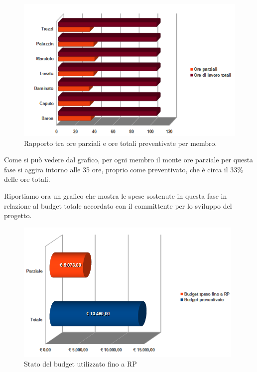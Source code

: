 \vspace{0cm}
\begin{figure}[htbp!]
  \centering
  \includegraphics[width=17.2cm, angle=0]{img/PP/ORE-RP.png}
\caption{Rapporto tra ore parziali e ore totali preventivate per membro.}
\end{figure}
\vspace{0.5cm}

Come si pu\`o vedere dal grafico, per ogni membro il monte ore parziale per
questa fase si aggira intorno alle 35 ore, proprio come preventivato, che \`e
circa il 33\% delle ore totali.

\newpage
Riportiamo ora un grafico che mostra le spese sostenute in questa
fase in relazione al budget totale accordato con il committente per lo sviluppo del progetto.

\vspace{0cm}
\begin{figure}[htbp!]
  \centering
  \includegraphics[width=11cm, angle=0]{img/PP/BUDGET-RP.png}
\caption{Stato del budget utilizzato fino a RP}
\end{figure}
\vspace{0.5cm}

